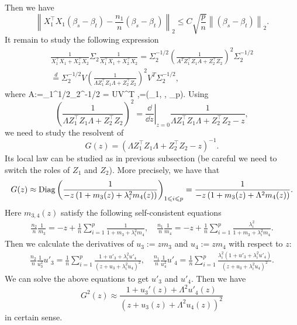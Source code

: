Then we have
$$  \left\|X_1^{\top}X_1 (\beta_s - \beta_t)  - \frac{n_1}{n}(\beta_s - \beta_t)\right\|_2 \le C \sqrt{\frac{p}{n}} \left\| (\beta_s - \beta_t)\right\|_2. $$
It remain to study the following expression 
\begin{align*}
\frac{1}{X_1^{\top}X_1 + X_2^{\top}X_2}  \Sigma_2 \frac{1}{X_1^{\top}X_1 + X_2^{\top}X_2}  = \Sigma_2^{-1/2}\left(\frac{1}{A^T Z_1^{\top}Z_1 A + Z_2^{\top}Z_2} \right)^2 \Sigma_2^{-1/2} \\
\stackrel{d}{=} \Sigma_2^{-1/2}V \left(\frac{1}{\Lambda Z_1^{\top}Z_1 \Lambda + Z_2^{\top}Z_2} \right)^2 V^T \Sigma_2^{-1/2},
\end{align*}
where 
\be  \label{eigen2}
A:=\Sigma_1^{1/2}\Sigma_2^{-1/2} = U\Lambda V^T ,\quad \Lambda=(\lambda_1, \cdots, \lambda_p).
\ee
Using 
$$\left(\frac{1}{\Lambda Z_1^{\top}Z_1 \Lambda + Z_2^{\top}Z_2} \right)^2 =\left. \frac{\dd }{\dd z}\right|_{z=0}\frac{1}{\Lambda Z_1^{\top}Z_1 \Lambda + Z_2^{\top}Z_2 - z} ,$$
we  need to study the resolvent of 
$$G(z) = \left( \Lambda Z_1^{\top}Z_1 \Lambda + Z_2^{\top}Z_2 - z \right)^{-1}.$$
Its local law can be studied as in previous subsection (be careful we need to switch the roles of $Z_1$ and $Z_2$). More precisely,  we have that 
$$ G(z) \approx \operatorname{Diag}\left( \frac{1}{-z\left( 1+ m_3(z) + \lambda_i^2 m_4(z)\right)}\right)_{1\leqslant i \leqslant p}= \frac{1}{-z\left( 1+ m_3(z) + \Lambda^2 m_4(z)\right)} .$$
Here $m_{3,4}(z)$ satisfy the following self-consistent equations
\begin{align}\label{m34shift}
\frac{n_2}{n}\frac1{m_3} = - z +\frac1n\sum_{i=1}^p \frac1{  1+m_3 + \lambda_i^2m_4  } ,\quad \frac{n_1}{n}\frac1{m_4} = - z +\frac1n\sum_{i=1}^p \frac{\lambda_i^2 }{  1+m_3 + \lambda_i^2m_4  } .
\end{align}
Then we calculate the derivatives of $u_3:=zm_3$ and $u_4:=zm_4$ with respect to $z$:
\begin{align}\label{dotm34}
\frac{n_2}{n}\frac1{u_3^2}u'_3 =  \frac1n\sum_{i=1}^p \frac{1+u'_3 + \lambda_i^2 u'_4}{ ( z+u_3 + \lambda_i^2u_4)^2  } ,\quad \frac{n_1}{n}\frac1{u_4^2}u'_4 =   \frac1n\sum_{i=1}^p \frac{\lambda_i^2\left(1+u'_3 + \lambda_i^2 u'_4\right) }{  (z+u_3 + \lambda_i^2u_4)^2  } .
\end{align}
We can solve the above equations to get $u'_3$ and $u'_4$. Then we have 
$$ G^2(z) \approx   \frac{1 +  u_3'(z) +\Lambda^2 u'_4(z)}{ \left( z+ u_3(z) + \Lambda^2  u_4(z)\right)^2}  $$
{\cob in certain sense}.

